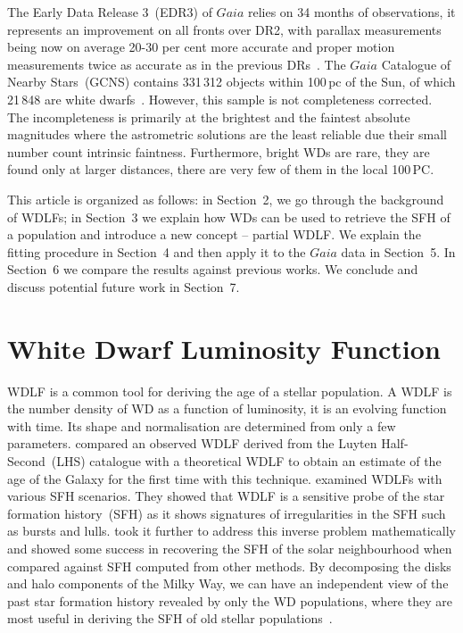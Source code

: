 \documentclass[fleqn,usenatbib]{mnras}
\begin{document}
The Early Data Release 3~(EDR3) of $Gaia$ relies on 34 months of observations, it
represents an improvement on all fronts over DR2, with parallax measurements
being now on average 20-30 per cent more accurate and proper motion measurements
twice as accurate as in the previous
DRs~\citep{2021A&A...649A...1G, 2021A&A...649A...2L}. The $Gaia$ Catalogue of
Nearby Stars~(GCNS) contains 331\,312 objects within 100\,pc of the Sun, of
which 21\,848 are white dwarfs~\citep{2021A&A...649A...6G}. However, this sample
is not completeness corrected. The incompleteness is primarily at the brightest
and the faintest absolute magnitudes where the astrometric solutions are the
least reliable due their small number count intrinsic faintness. Furthermore,
bright WDs are rare, they are found only at larger distances, there are very
few of them in the local 100\,PC.

This article is organized as follows: in Section~2, we go through the background
of WDLFs; in Section~3 we explain how WDs can be used to retrieve the SFH of a
population and introduce a new concept -- partial WDLF. We explain the fitting
procedure in Section~4 and then apply it to the $Gaia$ data in Section~5. In
Section~6 we compare the results against previous works. We conclude and discuss
potential future work in Section~7.

\section{White Dwarf Luminosity Function}
WDLF is a common tool for deriving the age of a stellar population. A WDLF is
the number density of WD as a function of luminosity, it is an evolving
function with time. Its shape and normalisation are determined from only a few
parameters. \citet{1987ApJ...315L..77W} compared an observed WDLF derived from
the Luyten Half-Second~(LHS) catalogue with a theoretical WDLF to obtain an
estimate of the age of the Galaxy for the first time with this technique.
\citet{1990ApJ...352..605N} examined WDLFs with various SFH scenarios. They
showed that WDLF is a sensitive probe of the star formation history~(SFH) as
it shows signatures of irregularities in the SFH such as bursts and lulls.
\citet{2013MNRAS.434.1549R} took it further to address this inverse problem
mathematically and showed some success in recovering the SFH of the solar
neighbourhood when compared against SFH computed from other methods. By
decomposing the disks and halo components of the Milky Way, we can have an
independent view of the past star formation history revealed by only the
WD populations, where they are most useful in deriving the SFH of old
stellar populations~\citep{2011MNRAS.417...93R, 2017ASPC..509...25L}.
\end{document}

